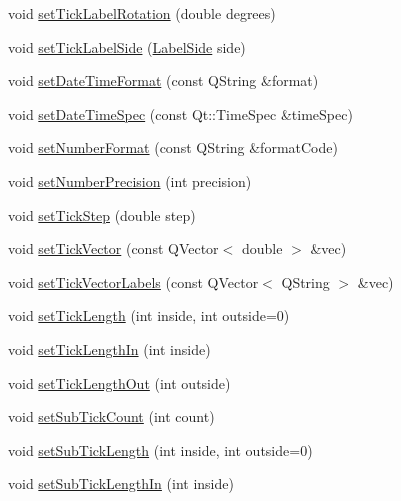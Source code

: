 \begin{DoxyCompactItemize}
\item 
void \mbox{\hyperlink{class_q_c_p_axis_a1bddd4413df8a576b7ad4b067fb33375}{set\+Tick\+Label\+Rotation}} (double degrees)
\item 
void \mbox{\hyperlink{class_q_c_p_axis_a13ec644fc6e22715744c92c6dfa4f0fa}{set\+Tick\+Label\+Side}} (\mbox{\hyperlink{class_q_c_p_axis_a24b13374b9b8f75f47eed2ea78c37db9}{Label\+Side}} side)
\item 
void \mbox{\hyperlink{class_q_c_p_axis_a2ee0191daa03524a682113e63e05f7a7}{set\+Date\+Time\+Format}} (const Q\+String \&format)
\item 
void \mbox{\hyperlink{class_q_c_p_axis_a262e06731debed7eee11fa6a81d67eaf}{set\+Date\+Time\+Spec}} (const Qt\+::\+Time\+Spec \&time\+Spec)
\item 
void \mbox{\hyperlink{class_q_c_p_axis_ae585a54dc2aac662e90a2ca82f002590}{set\+Number\+Format}} (const Q\+String \&format\+Code)
\item 
void \mbox{\hyperlink{class_q_c_p_axis_a21dc8023ad7500382ad9574b48137e63}{set\+Number\+Precision}} (int precision)
\item 
void \mbox{\hyperlink{class_q_c_p_axis_af727db0acc6492c4c774c0700e738205}{set\+Tick\+Step}} (double step)
\item 
void \mbox{\hyperlink{class_q_c_p_axis_a871db94c5d796c80fcbe1a9d4506e27e}{set\+Tick\+Vector}} (const Q\+Vector$<$ double $>$ \&vec)
\item 
void \mbox{\hyperlink{class_q_c_p_axis_a921d3ba3853ca3bd2cce3459f7a243ed}{set\+Tick\+Vector\+Labels}} (const Q\+Vector$<$ Q\+String $>$ \&vec)
\item 
void \mbox{\hyperlink{class_q_c_p_axis_a62ec40bebe3540e9c1479a8fd2be3b0d}{set\+Tick\+Length}} (int inside, int outside=0)
\item 
void \mbox{\hyperlink{class_q_c_p_axis_afae1a37a99611366275a51204d991739}{set\+Tick\+Length\+In}} (int inside)
\item 
void \mbox{\hyperlink{class_q_c_p_axis_a3b8a0debd1ffedd2c22d0592dfbb4e62}{set\+Tick\+Length\+Out}} (int outside)
\item 
void \mbox{\hyperlink{class_q_c_p_axis_a4b1554ead9d7f9799650d51383e326dd}{set\+Sub\+Tick\+Count}} (int count)
\item 
void \mbox{\hyperlink{class_q_c_p_axis_ab702d6fd42fc620607435339a1c2a2e1}{set\+Sub\+Tick\+Length}} (int inside, int outside=0)
\item 
void \mbox{\hyperlink{class_q_c_p_axis_ac46fa2a993a9f5789540977610acf1de}{set\+Sub\+Tick\+Length\+In}} (int inside)

\end{DoxyCompactItemize}
